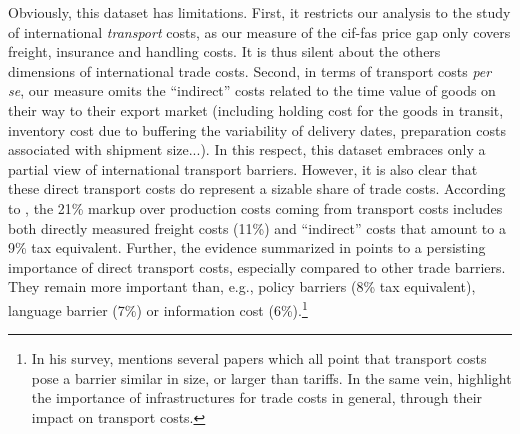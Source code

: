 \documentclass[a4paper,11pt]{article}
\begin{document}
Obviously, this dataset has limitations.
First, it restricts our analysis to the study of international \emph{transport}  costs, as our measure of the cif-fas price gap only covers freight, insurance and handling costs.
It is thus silent about the others dimensions of international trade costs.
Second, in terms of transport costs \textit{per se}, our measure omits the ``indirect'' costs related to the time value of goods on their way to their export market (including holding cost for the goods in transit, inventory cost due to buffering the variability of delivery dates, preparation costs associated with shipment size...).
In this respect, this dataset embraces only a partial view of international transport barriers.
However, it is also clear that these direct transport costs do represent a sizable share of trade costs.
According to \citet{anderson_wincoop_jel}, the 21\% markup over production costs coming from transport costs includes both directly measured freight costs (11\%) and ``indirect'' costs that amount to a  9\% tax equivalent.
Further, the evidence summarized in \citet{anderson_wincoop_jel} points to a persisting importance of direct transport costs, especially compared to other trade barriers.
They remain more important than, e.g., policy barriers (8\% tax equivalent), language barrier (7\%) or information cost (6\%).\footnote{In his survey, \citet{Hummels_1999} mentions several papers which all point that transport costs pose a barrier similar in size, or larger than tariffs.
In the same vein, \citet{limao_venables} highlight the importance of infrastructures for trade costs in general, through their impact on transport costs.}
\end{document}
